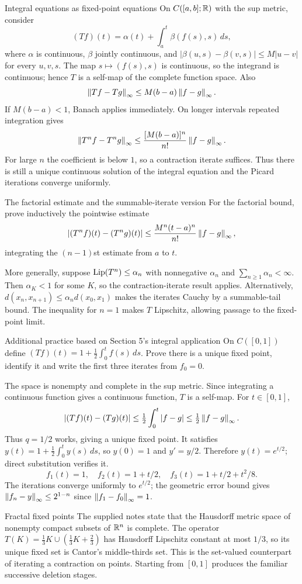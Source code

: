 \begin{note}{Integral equations as fixed-point equations}
On $C([a,b];\mathbb R)$ with the sup metric, consider
\[(Tf)(t)=\alpha(t)+\int_a^t\beta(f(s),s)\,ds,\]
where $\alpha$ is continuous, $\beta$ jointly continuous, and $|\beta(u,s)-\beta(v,s)|\le M|u-v|$ for every $u,v,s$. The map $s\mapsto(f(s),s)$ is continuous, so the integrand is continuous; hence $T$ is a self-map of the complete function space. Also
\[\left\lVert Tf-Tg\right\rVert_\infty\le M(b-a)\left\lVert f-g\right\rVert_\infty.\]
If $M(b-a)<1$, Banach applies immediately. On longer intervals repeated integration gives
\[\left\lVert T^nf-T^ng\right\rVert_\infty\le\frac{[M(b-a)]^n}{n!}\left\lVert f-g\right\rVert_\infty.\]
For large $n$ the coefficient is below $1$, so a contraction iterate suffices. Thus there is still a unique continuous solution of the integral equation and the Picard iterations converge uniformly.
\end{note}
\begin{note}{The factorial estimate and the summable-iterate version}
For the factorial bound, prove inductively the pointwise estimate
\[|(T^nf)(t)-(T^ng)(t)|\le\frac{M^n(t-a)^n}{n!}\left\lVert f-g\right\rVert_\infty,\]
integrating the $(n-1)$st estimate from $a$ to $t$.

More generally, suppose $\operatorname{Lip}(T^n)\le\alpha_n$ with nonnegative $\alpha_n$ and $\sum_{n\ge1}\alpha_n<\infty$. Then $\alpha_K<1$ for some $K$, so the contraction-iterate result applies. Alternatively, $d(x_n,x_{n+1})\le\alpha_nd(x_0,x_1)$ makes the iterates Cauchy by a summable-tail bound. The inequality for $n=1$ makes $T$ Lipschitz, allowing passage to the fixed-point limit.
\end{note}
\begin{exam}{Additional practice based on Section 5's integral application}
On $C([0,1])$ define $(Tf)(t)=1+\frac12\int_0^tf(s)\,ds$. Prove there is a unique fixed point, identify it and write the first three iterates from $f_0=0$.
\end{exam}
\begin{answer}
The space is nonempty and complete in the sup metric. Since integrating a continuous function gives a continuous function, $T$ is a self-map. For $t\in[0,1]$,
\[|(Tf)(t)-(Tg)(t)|\le\tfrac12\int_0^t|f-g|\le\tfrac12\left\lVert f-g\right\rVert_\infty.\]
Thus $q=1/2$ works, giving a unique fixed point. It satisfies $y(t)=1+\frac12\int_0^ty(s)\,ds$, so $y(0)=1$ and $y'=y/2$. Therefore $y(t)=e^{t/2}$; direct substitution verifies it.
\[f_1(t)=1,\quad f_2(t)=1+t/2,\quad f_3(t)=1+t/2+t^2/8.\]
The iterations converge uniformly to $e^{t/2}$; the geometric error bound gives $\left\lVert f_n-y\right\rVert_\infty\le2^{1-n}$ since $\left\lVert f_1-f_0\right\rVert_\infty=1$.
\end{answer}
\begin{note}{Fractal fixed points}
The supplied notes state that the Hausdorff metric space of nonempty compact subsets of $\mathbb R^n$ is complete. The operator $T(K)=\frac13K\cup(\frac13K+\frac23)$ has Hausdorff Lipschitz constant at most $1/3$, so its unique fixed set is Cantor's middle-thirds set. This is the set-valued counterpart of iterating a contraction on points. Starting from $[0,1]$ produces the familiar successive deletion stages.
\end{note}


